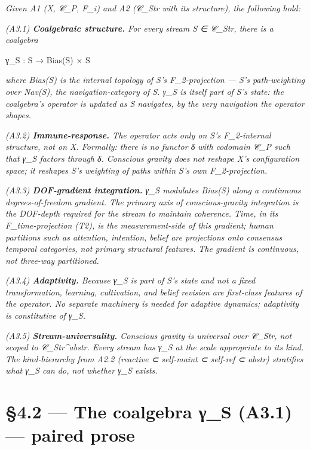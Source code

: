 \documentclass[11pt, openany]{book}
\newcommand{\sectionbreak}{\clearpage}
\begin{document}
\textit{Given A1 (X, 𝒞\_\allowbreak{}P, F\_\allowbreak{}i) and A2 (𝒞\_\allowbreak{}Str with its structure), the following hold:}

\textit{(A3.1) \textbf{Coalgebraic structure.} For every stream S ∈ 𝒞\_\allowbreak{}Str, there is a coalgebra}
\begin{Code}
γ_S : S → Bias(S) × S
\end{Code}
\textit{where Bias(S) is the internal topology of S's F\_\allowbreak{}2-projection --- S's path-weighting over Nav(S), the navigation-category of S. γ\_\allowbreak{}S is itself part of S's state: the coalgebra's operator is updated as S navigates, by the very navigation the operator shapes.}

\textit{(A3.2) \textbf{Immune-response.} The operator acts only on S's F\_\allowbreak{}2-internal structure, not on X. Formally: there is no functor δ with codomain 𝒞\_\allowbreak{}P such that γ\_\allowbreak{}S factors through δ. Conscious gravity does not reshape X's configuration space; it reshapes S's weighting of paths within S's own F\_\allowbreak{}2-projection.}

\textit{(A3.3) \textbf{DOF-gradient integration.} γ\_\allowbreak{}S modulates Bias(S) along a continuous degrees-of-freedom gradient. The primary axis of conscious-gravity integration is the DOF-depth required for the stream to maintain coherence. Time, in its F\_\allowbreak{}time-projection (T2), is the measurement-side of this gradient; human partitions such as attention, intention, belief are projections onto consensus temporal categories, not primary structural features. The gradient is continuous, not three-way partitioned.}

\textit{(A3.4) \textbf{Adaptivity.} Because γ\_\allowbreak{}S is part of S's state and not a fixed transformation, learning, cultivation, and belief revision are first-class features of the operator. No separate machinery is needed for adaptive dynamics; adaptivity is constitutive of γ\_\allowbreak{}S.}

\textit{(A3.5) \textbf{Stream-universality.} Conscious gravity is universal over 𝒞\_\allowbreak{}Str, not scoped to 𝒞\_\allowbreak{}Str\textasciicircum{}abstr. Every stream has γ\_\allowbreak{}S at the scale appropriate to its kind. The kind-hierarchy from A2.2 (reactive ⊂ self-maint ⊂ self-ref ⊂ abstr) stratifies what γ\_\allowbreak{}S can do, not whether γ\_\allowbreak{}S exists.}

\sectionbreak

\section{§4.2 --- The coalgebra γ\_\allowbreak{}S (A3.1) --- paired prose}
\end{document}
